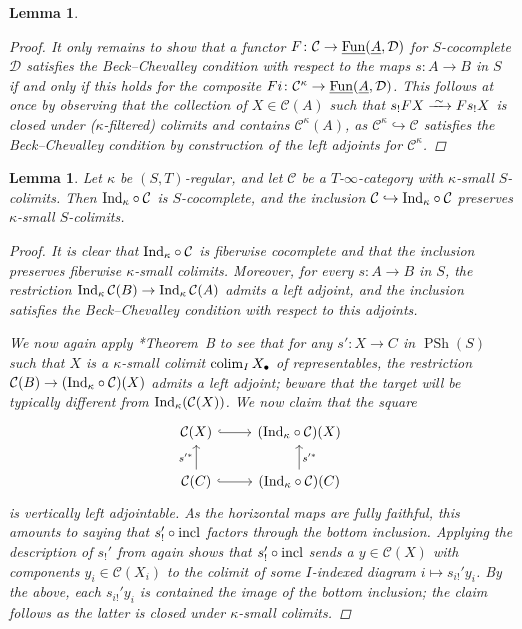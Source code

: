 \documentclass[reqno]{memo-l}
\theoremstyle{mythm}
\newtheorem{lemma}[thm]{Lemma}
\theoremstyle{definition}
\numberwithin{equation}{section}
\newcommand{\Cc}{{\mathcal{C}}}
\newcommand{\Dd}{{\mathcal{D}}}
\newcommand{\Fun}{{\textup{Fun}}}
\DeclareMathOperator{\PSh}{PSh}
\newcommand{\colim}{\mathop{\textup{colim}}}
\newcommand{\Ind}{\mathop{\textup{Ind}}\nolimits}
\newcommand{\ulhelper}[2]{\underline{\setbox0=\hbox{$#1#2$}\dp0=0.4pt \box0\relax}}
\newcommand{\ul}[1]{{\mathpalette\ulhelper{#1}}\hbox{\rule[-2pt]{0pt}{0pt}}}
\newcommand{\incl}{{\mathop{\textup{incl}}}}
\newcommand{\iso}{\xrightarrow{\;\smash{\raisebox{-0.25ex}{\ensuremath{\scriptstyle\sim}}}\;}}
\begin{document}
\begin{lemma}
\begin{proof}
        It only remains to show that a functor $F\colon\Cc\to\ul\Fun(\ul A,\Dd)$ for $S$-cocomplete $\Dd$ satisfies the Beck--Chevalley condition with respect to the maps $s\colon A\to B$ in $S$ if and only if this holds for the composite $Fi\colon\Cc^\kappa\to\ul\Fun(\ul A,\Dd)$. This follows at once by observing that the collection of $X\in\Cc(A)$ such that $s_!FX\iso Fs_!X$ is closed under ($\kappa$-filtered) colimits and contains $\Cc^\kappa(A)$, as $\Cc^\kappa\hookrightarrow\Cc$ satisfies the Beck--Chevalley condition by construction of the left adjoints for $\Cc^\kappa$.
    \end{proof}
\end{lemma}

\begin{lemma}\label{lemma:fiberwise-ind-kappa-completion}
    Let $\kappa$ be $(S,T)$-regular, and let $\Cc$ be a $T$-$\infty$-category with $\kappa$-small $S$-colimits. Then ${\Ind_\kappa}\circ\Cc$ is $S$-cocomplete, and the inclusion $\Cc\hookrightarrow {\Ind_\kappa}\circ\Cc$ preserves $\kappa$-small $S$-colimits.
    \begin{proof}
        It is clear that ${\Ind_\kappa}\circ\Cc$ is fiberwise cocomplete and that the inclusion preserves fiberwise $\kappa$-small colimits. Moreover, for every $s\colon A\to B$ in $S$, the restriction $\Ind_\kappa \Cc(B)\to\Ind_\kappa\Cc(A)$ admits a left adjoint, and the inclusion satisfies the Beck--Chevalley condition with respect to this adjoints.

        We now again apply \cite{descent-lim}*{Theorem~B} to see that for any $s'\colon X\to C$ in $\PSh(S)$ such that $X$ is a $\kappa$-small colimit $\colim_{I}X_\bullet$ of representables, the restriction $\Cc(B)\to ({\Ind_\kappa}\circ\Cc)(X)$ admits a left adjoint; beware that the target will be typically different from $\Ind_\kappa(\Cc(X))$. We now claim that the square
        \[
            \begin{tikzcd}
                \Cc(X)\arrow[r,hook]\arrow[from=d,"s'^*"] & ({\Ind_\kappa}\circ\Cc)(X)\arrow[from=d,"s'^*"']\\
                \Cc(C)\arrow[r,hook] & ({\Ind_\kappa}\circ\Cc)(C)
            \end{tikzcd}
        \]
        is vertically left adjointable. As the horizontal maps are fully faithful, this amounts to saying that $s_!'\circ\incl$ factors through the bottom inclusion. Applying the description of $s_!'$ from \cite{descent-lim} again shows that $s_!'\circ\incl$ sends a $y\in\Cc(X)$ with components $y_i\in\Cc(X_i)$ to the colimit of some $I$-indexed diagram $i\mapsto s_{i!}'y_i$. By the above, each $s_{i!}'y_i$ is contained the image of the bottom inclusion; the claim follows as the latter is closed under $\kappa$-small colimits.


\end{proof}
\end{lemma}
\end{document}
